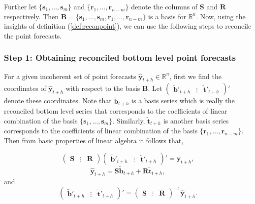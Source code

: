 \documentclass[a4paper, 11pt]{article}
\begin{document}
Further let $\{\bm{s}_1,...,\bm{s}_m\}$ and $\{\bm{r}_1,...,\bm{r}_{n-m}\}$ denote the columns of $\bm{S}$ and $\bm{R}$ respectively. Then $\bm{B}=\{\bm{s}_1,...,\bm{s}_m, \bm{r}_1,...,\bm{r}_{n-m}\}$ is a basis for $\mathbb{R}^n$. Now, using the insights of definition (\ref{def:reconpoint}), we can use the following steps to reconcile the point forecasts.

\subsubsection*{Step 1: Obtaining reconciled bottom level point forecasts}

For a given incoherent set of point forecasts $\hat{\bm{y}}_{t+h} \in \mathbb{R}^n$, first we find the coordinates of $\hat{\bm{y}}_{t+h}$ with respect to the basis $\bm{B}$. Let $\begin{pmatrix}\tilde{\bm{b}}'_{t+h} & \vdots& \tilde{\bm{t}}'_{t+h}\end{pmatrix}'$ denote these coordinates. Note that $\tilde{\bm{b}}_{t+h}$ is a basis series which is really the reconciled bottom level series that corresponds to the coefficients of linear combination of the basis $\{\bm{s}_1,...,\bm{s}_m\}$. Similarly, $\tilde{\bm{t}}_{t+h}$ is another basis series corresponds to the coefficients of linear combination of the basis $\{\bm{r}_1,...,\bm{r}_{n-m}\}$. Then from basic properties of linear algebra it follows that, 

\[
\begin{pmatrix}
\bm{S} & \vdots& \bm{R}
\end{pmatrix}
\begin{pmatrix}
\tilde{\bm{b}}'_{t+h} & \vdots& \tilde{\bm{t}}'_{t+h}
\end{pmatrix}'
= \hat{\bm{y}}_{t+h},
\]
\[
\hat{\bm{y}}_{t+h} = \bm{S}\tilde{\bm{b}}_{t+h} +  \bm{R}\tilde{\bm{t}}_{t+h},
\]
and
\begin{equation}\label{4.3}
\begin{pmatrix}
\tilde{\bm{b}}'_{t+h} & \vdots& \tilde{\bm{t}}'_{t+h}
\end{pmatrix}' =
\begin{pmatrix}
\bm{S} & \vdots& \bm{R}
\end{pmatrix}^{-1}
\hat{\bm{y}}_{t+h}.
\end{equation}
\end{document}
